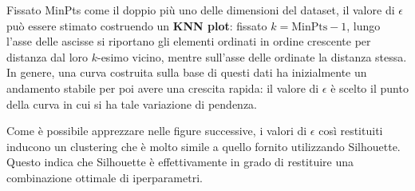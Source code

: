 \documentclass[a4paper, 12pt]{report}
\begin{document}
			Fissato MinPts come il doppio più uno delle dimensioni del dataset,
			il valore di $\epsilon$ può essere stimato costruendo un \textbf{KNN
			plot}: fissato $k = \textrm{MinPts} - 1$, lungo l'asse delle ascisse
			si riportano gli elementi ordinati in ordine crescente per distanza
			dal loro $k$-esimo vicino, mentre sull'asse delle ordinate la distanza
			stessa. In genere, una curva costruita sulla base di questi dati ha
			inizialmente un andamento stabile per poi avere una crescita rapida:
			il valore di $\epsilon$ è scelto il punto della curva in cui si ha
			tale variazione di pendenza.

			Come è possibile apprezzare nelle figure successive, i valori
			di $\epsilon$ così restituiti inducono un clustering che è molto
			simile a quello fornito utilizzando Silhouette. Questo indica che
			Silhouette è effettivamente in grado di restituire una combinazione
			ottimale di iperparametri.
\end{document}
